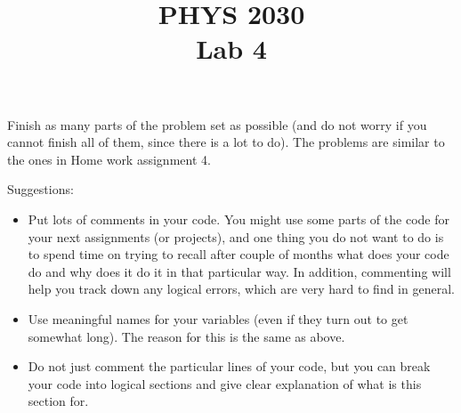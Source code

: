 \documentclass[letterpaper]{article}
\title{PHYS 2030 \\Lab 4}
\begin{document}
\maketitle
Finish as many parts of the problem set as possible (and do not worry if you cannot finish all of them, since there is a lot to do). The problems are similar to the ones in Home work assignment 4.

Suggestions: 
\begin{itemize}
\item Put lots of comments in your code. You might use some parts of the code for your next assignments (or projects), and one thing you do not want to do is to spend time on trying to recall after couple of months what does your code do and why does it do it in that particular way. In addition, commenting will help you track down any logical errors, which are very hard to find in general.
\item  Use meaningful names for your variables (even if they turn out to get somewhat long). The reason for this is the same as above.
\item Do not just comment the particular lines of your code, but you can break your code into logical sections and give clear explanation of what is this section for.
\end{itemize}
\end{document}
